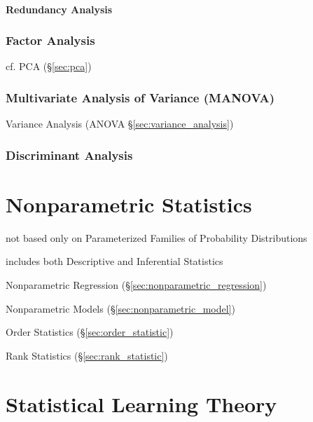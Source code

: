 \paragraph{Redundancy Analysis}\label{sec:redundancy_analysis}\hfill



\subsubsection{Factor Analysis}\label{sec:factor_analysis}

cf. PCA (\S\ref{sec:pca})



\subsubsection{Multivariate Analysis of Variance (MANOVA)}\label{sec:manova}

Variance Analysis (ANOVA \S\ref{sec:variance_analysis})



\subsubsection{Discriminant Analysis}\label{sec:discriminant_analysis}



\section{Nonparametric Statistics}\label{sec:nonparametric_statistics}

not based only on Parameterized Families of Probability Distributions

includes both Descriptive and Inferential Statistics

Nonparametric Regression (\S\ref{sec:nonparametric_regression})

Nonparametric Models (\S\ref{sec:nonparametric_model})

Order Statistics (\S\ref{sec:order_statistic})

Rank Statistics (\S\ref{sec:rank_statistic})



\section{Statistical Learning Theory}\label{sec:statistical_learning_theory}

